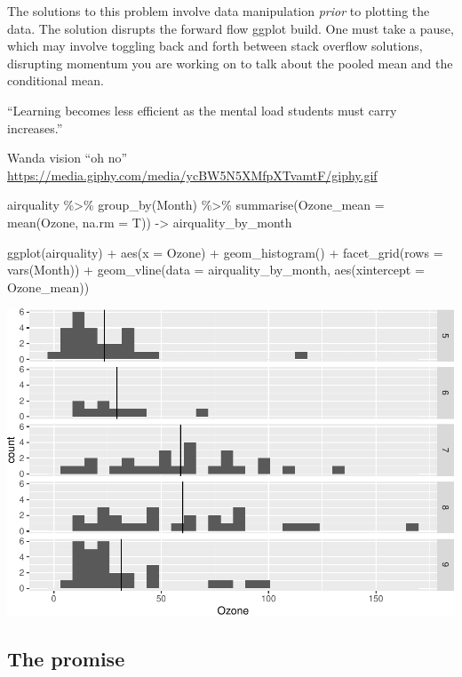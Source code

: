 \documentclass[12pt]{article}
\newenvironment{Shaded}{\begin{snugshade}}{\end{snugshade}}
\newcommand{\AttributeTok}[1]{\textcolor[rgb]{0.77,0.63,0.00}{#1}}
\newcommand{\FunctionTok}[1]{\textcolor[rgb]{0.00,0.00,0.00}{#1}}
\newcommand{\NormalTok}[1]{#1}
\newcommand{\OtherTok}[1]{\textcolor[rgb]{0.56,0.35,0.01}{#1}}
\newcommand{\SpecialCharTok}[1]{\textcolor[rgb]{0.00,0.00,0.00}{#1}}
\begin{document}
The solutions to this problem involve data manipulation \emph{prior} to
plotting the data. The solution disrupts the forward flow ggplot build.
One must take a pause, which may involve toggling back and forth between
stack overflow solutions, disrupting momentum you are working on to talk
about the pooled mean and the conditional mean.

``Learning becomes less efficient as the mental load students must carry
increases.'' \citep{lovett2000statscongnitive}

Wanda vision ``oh no''
\url{https://media.giphy.com/media/ycBW5N5XMfpXTvamtF/giphy.gif}

\begin{Shaded}
\begin{Highlighting}[]
\NormalTok{airquality }\SpecialCharTok{\%\textgreater{}\%} 
  \FunctionTok{group\_by}\NormalTok{(Month) }\SpecialCharTok{\%\textgreater{}\%} 
  \FunctionTok{summarise}\NormalTok{(}\AttributeTok{Ozone\_mean =} \FunctionTok{mean}\NormalTok{(Ozone, }\AttributeTok{na.rm =}\NormalTok{ T)) }\OtherTok{{-}\textgreater{}}
\NormalTok{airquality\_by\_month}

\FunctionTok{ggplot}\NormalTok{(airquality) }\SpecialCharTok{+} 
  \FunctionTok{aes}\NormalTok{(}\AttributeTok{x =}\NormalTok{ Ozone) }\SpecialCharTok{+} 
  \FunctionTok{geom\_histogram}\NormalTok{() }\SpecialCharTok{+} 
  \FunctionTok{facet\_grid}\NormalTok{(}\AttributeTok{rows =} \FunctionTok{vars}\NormalTok{(Month)) }\SpecialCharTok{+}
  \FunctionTok{geom\_vline}\NormalTok{(}\AttributeTok{data =}\NormalTok{ airquality\_by\_month, }
             \FunctionTok{aes}\NormalTok{(}\AttributeTok{xintercept =} 
\NormalTok{               Ozone\_mean))}
\end{Highlighting}
\end{Shaded}

\begin{center}\includegraphics[width=0.5\linewidth]{manuscript_files/figure-latex/unnamed-chunk-4-1} \end{center}

\hypertarget{the-promise}{%
\subsection{The promise}\label{the-promise}}
\end{document}

